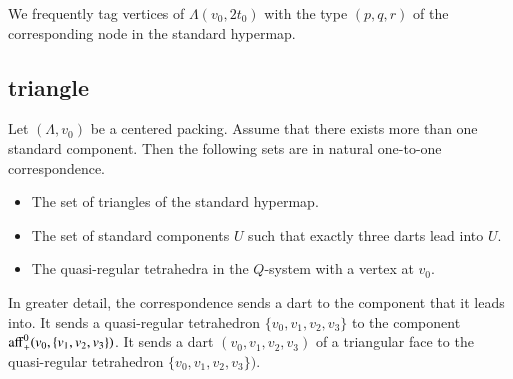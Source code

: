 We frequently tag vertices of $\Lambda(v_0,2t_0)$ with the
type $(p,q,r)$ of the corresponding node in the standard hypermap.









\subsection{triangle}

\begin{lemma}\label{lemma:tri-class}  
Let $(\Lambda,v_0)$ be a centered packing.  Assume
that there exists more than one standard component.
Then the following sets are in natural one-to-one correspondence.
\begin{itemize}
\item The set of triangles of the standard hypermap.
\item The set of standard components $U$ such that exactly three
 darts lead into $U$.
\item The quasi-regular tetrahedra in the $Q$-system with a vertex at $v_0$.
\end{itemize}
In greater detail,
the correspondence sends a dart to the component that it leads into.
It sends a quasi-regular tetrahedron $\{v_0,v_1,v_2,v_3\}$ to
the component ${\operatorname{aff}}_+^0(v_0,\{v_1,v_2,v_3\})$.  It sends a dart
$(v_0,v_1,v_2,v_3)$ of a triangular face to the quasi-regular tetrahedron
$\{v_0,v_1,v_2,v_3\})$.
\end{lemma}

